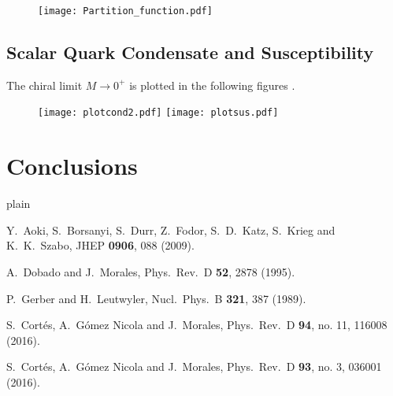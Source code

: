 \documentclass[b1]{sciposter}
\begin{document}
\begin{multicols}{2}
\begin{figure}[]
\centering
\texttt{[image: Partition\_function.pdf]}
\label{fig:partfun}
\end{figure}


\subsection{Scalar Quark Condensate and Susceptibility}

The chiral limit $M\rightarrow 0^{+}$ is plotted in the following figures \cite{Cortes:2016ecy}.

\begin{figure}[H]
\begin{center}
\centerline{\texttt{[image: plotcond2.pdf]} \texttt{[image: plotsus.pdf]}}
\end{center}
\label{fig:partfun}
\end{figure}

\vspace{-0.5cm}

\blindtext

\section{Conclusions} 

\blindtext

 {plain} 
\begin{thebibliography}{10}

  Y.~Aoki, S.~Borsanyi, S.~Durr, Z.~Fodor, S.~D.~Katz, S.~Krieg and K.~K.~Szabo,
  JHEP {\bf 0906}, 088 (2009).
	
  A.~Dobado and J.~Morales,
  Phys.\ Rev.\ D {\bf 52}, 2878 (1995).
	
	
  P.~Gerber and H.~Leutwyler,
  Nucl.\ Phys.\  B {\bf 321}, 387 (1989).
	
	
  S.~Cort\'es, A.~G\'omez Nicola and J.~Morales,
  Phys.\ Rev.\ D {\bf 94}, no. 11, 116008 (2016).
	

  S.~Cort\'es, A.~G\'omez Nicola and J.~Morales,
  Phys.\ Rev.\ D {\bf 93}, no. 3, 036001 (2016).
	
\end{thebibliography} 
 \end{multicols} 
 
\end{document}
